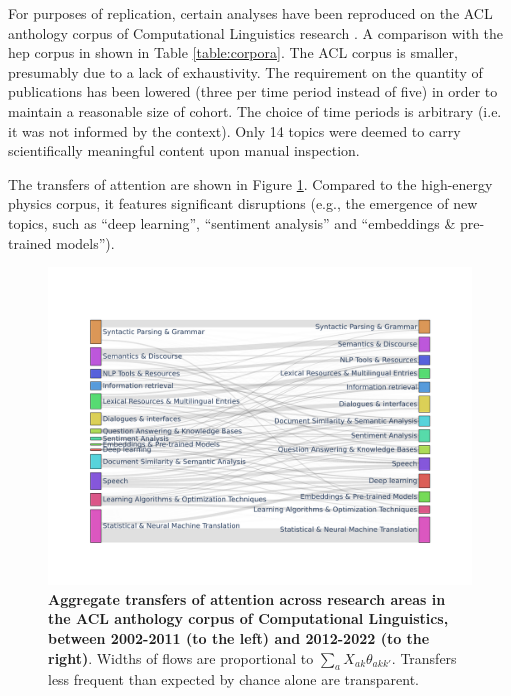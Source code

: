 \documentclass{article}
\begin{document}
For purposes of replication, certain analyses have been reproduced on the ACL anthology corpus of Computational Linguistics research \citep{acl_anthology_corpus}. A comparison with the \gls{hep} corpus in shown in Table \ref{table:corpora}. The ACL corpus is smaller, presumably due to a lack of exhaustivity. The requirement on the quantity of publications has been lowered (three per time period instead of five) in order to maintain a reasonable size of cohort. The choice of time periods is arbitrary (i.e. it was not informed by the context). Only 14 topics were deemed to carry scientifically meaningful content upon manual inspection. 



The transfers of attention are shown in Figure \ref{fig:sankey_acl}. Compared to the high-energy physics corpus, it features significant disruptions (e.g., the emergence of new topics, such as ``deep learning'', ``sentiment analysis'' and ``embeddings \& pre-trained models'').

 \begin{figure}[h]
     \centering
     \includegraphics[width=\textwidth]{Fig17.pdf}
     \caption{\textbf{Aggregate transfers of attention across research areas in the ACL anthology corpus of Computational Linguistics, between 2002-2011 (to the left) and 2012-2022 (to the right)}. Widths of flows are proportional to $\sum_a X_{ak}\theta_{akk'}$. Transfers less frequent than expected by chance alone are transparent. }
     \label{fig:sankey_acl}
 \end{figure}


\end{document}
